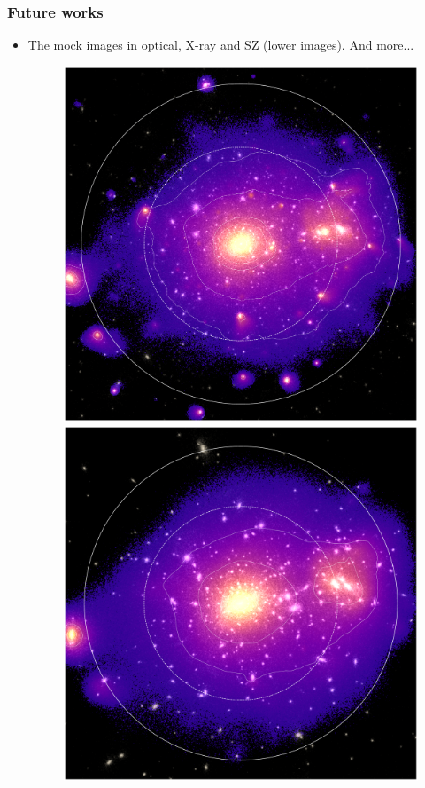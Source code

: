 \documentclass[aspectratio=1610]{beamer}
\begin{document}
\begin{frame}
  \frametitle{Future works}
  \begin{itemize}
    \item The mock images in optical, X-ray and SZ (lower images). \alert{And more...}
      \begin{figure}
        \includegraphics[width=0.48\linewidth]{Music-17-image}
        \includegraphics[width=0.48\linewidth]{G3X-17-image}
      \end{figure}
  \end{itemize}
\end{frame}
\end{document}
